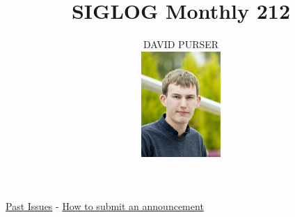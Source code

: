 \documentclass[prodmode,acmtecs]{acmsmall} %
\newcounter{colstart}
\begin{document}
\setcounter{colstart}{\thepage}

\title{\huge\sc SIGLOG Monthly 212}
\author{DAVID PURSER
\vspace*{-2.6cm}\begin{flushright}\includegraphics[width=30mm]{dp}\end{flushright}
}

\maketitlee

\href{https://lics.siglog.org/newsletters/}{Past Issues}
 - 
\href{https://lics.siglog.org/newsletters/inst.html}{How to submit an announcement}
\end{document}
